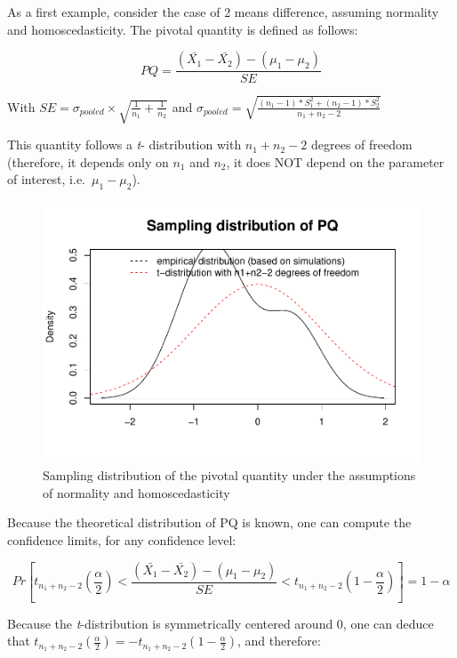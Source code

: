 \documentclass[man,floatsintext]{apa6}
\begin{document}
As a first example, consider the case of 2 means difference, assuming normality and homoscedasticity. The pivotal quantity is defined as follows:

\begin{equation} 
PQ= \frac{(\bar{X_1}-\bar{X_2})-(\mu_1-\mu_2)}{SE}
\label{eq:PQstudent}
\end{equation}

With \(SE = \sigma_{pooled} \times \sqrt{\frac{1}{n_1}+\frac{1}{n_2}}\) and \(\sigma_{pooled} = \sqrt{\frac{(n_1-1)*S^2_1+(n_2-1)*S^2_2}{n_1+n_2-2}}\)

This quantity follows a \emph{t}- distribution with \(n_1+n_2-2\) degrees of freedom (therefore, it depends only on \(n_1\) and \(n_2\), it does NOT depend on the parameter of interest, i.e.~\(\mu_1-\mu_2\)).

\begin{figure}
\centering
\includegraphics{CI-Reminder_files/figure-latex/SAMPLMEANDIFF1-1.pdf}
\caption{\label{fig:SAMPLMEANDIFF1}Sampling distribution of the pivotal quantity under the assumptions of normality and homoscedasticity}
\end{figure}

Because the theoretical distribution of PQ is known, one can compute the confidence limits, for any confidence level:

\begin{equation} 
Pr[t_{n_1+n_2-2}(\frac{\alpha}{2}) < \frac{(\bar{X_1}-\bar{X_2})-(\mu_1-\mu_2)}{SE} < t_{n_1+n_2-2}(1-\frac{\alpha}{2})] = 1 - \alpha
\label{eq:conflev1}
\end{equation}

Because the \emph{t}-distribution is symmetrically centered around 0, one can deduce that \(t_{n_1+n_2-2}(\frac{\alpha}{2})=-t_{n_1+n_2-2}(1-\frac{\alpha}{2})\), and therefore:
\end{document}

